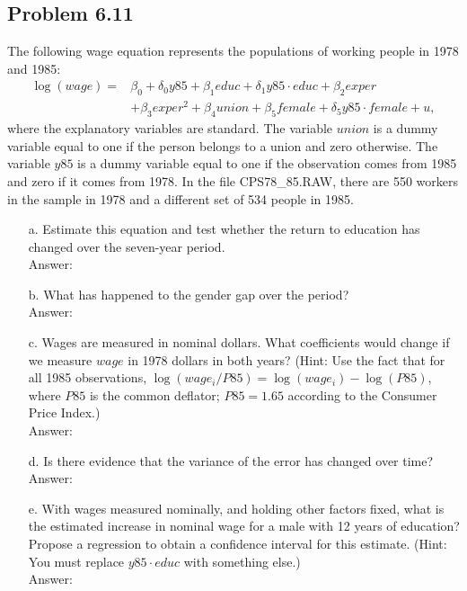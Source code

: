 \documentclass[10pt]{article}
\begin{document}
\subsection*{Problem 6.11}
The following wage equation represents the populations of working people in 1978 and 1985:
\begin{align*}
    \log(wage)=&\beta_0+ \delta_0 y85+\beta_1 educ+\delta_1 y85\cdot educ + \beta_2 exper \\
    &+\beta_3 exper^2 + \beta_4 union +\beta_5 female +\delta_5 y85\cdot female+u,
\end{align*}
where the explanatory variables are standard. The variable $union$ is a dummy variable equal to one if the person belongs to a union and zero otherwise. The variable $y85$ is a dummy variable equal to one if the observation comes from 1985 and zero if it comes from 1978. In the file CPS78\_85.RAW, there are 550 workers in the sample in 1978 and a different set of 534 people in 1985. 
\begin{enumerate}
\item[a.] Estimate this equation and test whether the return to education has changed over the seven-year period.
\\ Answer: \\

\item[b.] What has happened to the gender gap over the period? 
\\ Answer: \\

\item[c.] Wages are measured in nominal dollars. What coefficients would change if we measure $wage$ in 1978 dollars in both years? (Hint: Use the fact that for all 1985 observations, $\log(wage_i/P85)=\log(wage_i)-\log(P85)$, where $P85$ is the common deflator; $P85=1.65$ according to the Consumer Price Index.)
\\ Answer: \\

\item[d.] Is there evidence that the variance of the error has changed over time?
\\ Answer: \\

\item[e.] With wages measured nominally, and holding other factors fixed, what is the estimated increase in nominal wage for a male with 12 years of education? Propose a regression to obtain a confidence interval for this estimate. (Hint: You must replace $y85\cdot educ$ with something else.)
\\ Answer: \\
 
\end{enumerate}
\end{document}
